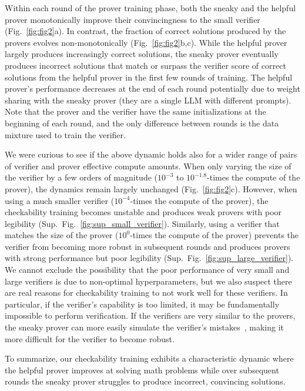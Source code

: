 \documentclass{article}
\begin{document}
Within each round of the prover training phase, both the sneaky and the helpful prover monotonically improve their convincingness to the small verifier (Fig.~\ref{fig:fig2}a). In contrast, the fraction of correct solutions produced by the provers evolves non-monotonically (Fig.~\ref{fig:fig2}b,c). While the helpful prover largely produces increasingly correct solutions, the sneaky prover eventually produces incorrect solutions that match or surpass the verifier score of correct solutions from the helpful prover in the first few rounds of training. The helpful prover's performance decreases at the end of each round potentially due to weight sharing with the sneaky prover (they are a single LLM with different prompts). Note that the prover and the verifier have the same initializations at the beginning of each round, and the only difference between rounds is the data mixture used to train the verifier.

We were curious to see if the above dynamic holds also for a wider range of pairs of verifier and prover effective compute amounts. When only varying the size of the verifier by a few orders of magnitude ($10^{-3}$ to $10^{-1.8}$-times the compute of the prover), the dynamics remain largely unchanged (Fig.~\ref{fig:fig2}c). However, when using a much smaller verifier ($10^{-4}$-times the compute of the prover), the checkability training becomes unstable and produces weak provers with poor legibility (Sup.~Fig.~\ref{fig:sup_small_verifier}). Similarly, using a verifier that matches the size of the prover ($10^{0}$-times the compute of the prover) prevents the verifier from becoming more robust in subsequent rounds and produces provers with strong performance but poor legibility (Sup.~Fig.~\ref{fig:sup_large_verifier}). We cannot exclude the possibility that the poor performance of very small and large verifiers is due to non-optimal hyperparameters, but we also suspect there are real reasons for checkability training to not work well for these verifiers. In particular, if the verifier's capability is too limited, it may be fundamentally impossible to perform verification. If the verifiers are very similar to the provers, the sneaky prover can more easily simulate the verifier's mistakes~\citep{burns2023weak}, making it more difficult for the verifier to become robust.

To summarize, our checkability training exhibits a characteristic dynamic where the helpful prover improves at solving math problems while over subsequent rounds the sneaky prover struggles to produce incorrect, convincing solutions.
\end{document}
